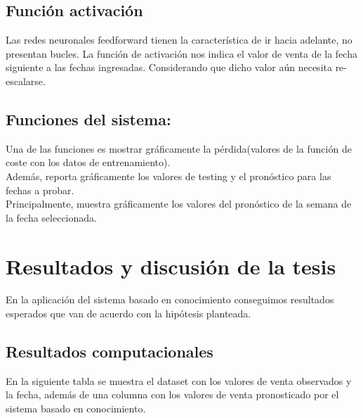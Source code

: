 \newpage
\section{Función activación}
Las redes neuronales feedforward tienen la característica de ir hacia adelante, no presentan bucles. La función de activación nos indica el valor de venta de la fecha siguiente a las fechas ingresadas. Considerando que dicho valor aún necesita re-escalarse.
\newpage

\section{Funciones del sistema:}

Una de las funciones es mostrar gráficamente la pérdida(valores de la función de coste con los datos de entrenamiento).\\
Además, reporta gráficamente los valores de testing y el pronóstico para las fechas a probar.\\
Principalmente, muestra gráficamente los valores del pronóstico de la semana de la fecha seleccionada.

\newpage


\chapter{Resultados y discusión de la tesis}

En la aplicación del sistema basado en conocimiento conseguimos resultados esperados que van de acuerdo con la hipótesis planteada.


\section{Resultados computacionales}

En la siguiente tabla se muestra el dataset con los valores de venta observados y la fecha, además de una columna con los valores de venta pronosticado por el sistema basado en conocimiento.\\


